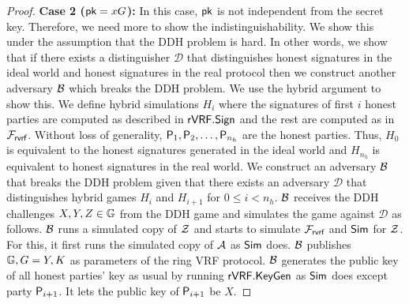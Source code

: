 \begin{proof}
	\textbf{Case 2 ($ \mathsf{pk} = x G$):} In this case, $ \mathsf{pk} $ is not independent from the secret key. Therefore, we need more to show the indistinguishability. We  show this under the assumption that the DDH problem  is hard.  In other words, we show that if there exists a distinguisher $ \mathcal{D} $ that distinguishes honest signatures in the ideal world and honest signatures in the real protocol then we construct another adversary $ \mathcal{B} $ which breaks the DDH problem. 
	We use the hybrid argument to show this.
	We define hybrid simulations $ H_{i} $ where  the signatures of first $ i $ honest parties are computed as described in $ {\mathsf{rVRF}}.{\mathsf{Sign}} $ and the rest are computed as in $ \mathcal{F}_{\textsf{rvrf}} $. Without loss of generality, $ \mathsf{P}_1, \mathsf{P}_2, \ldots, \mathsf{P}_{n_h} $ are the honest parties. Thus, $ H_0 $ is equivalent to the honest signatures generated in the ideal world  and $ H_{n_h}  $ is equivalent to  honest signatures in the real world.  We construct an adversary $ \mathcal{B} $ that breaks the DDH problem given that there exists an adversary $ \mathcal{D} $ that distinguishes hybrid games $ H_i $ and $ H_{i + 1} $ for $ 0 \leq i < n_h $. $\mathcal{B} $ receives the DDH challenges $ X,Y, Z \in {\mathbb{G}} $ from the DDH game and simulates the game against $ \mathcal{D} $ as follows. 
	$ \mathcal{B} $ runs a simulated copy of $ \mathcal{Z} $ and starts to simulate $ \mathcal{F}_{\textsf{rvrf}} $ and $ \mathsf{Sim} $ for $ \mathcal{Z} $. For this, it first runs the simulated copy of $ \mathcal{A} $ as $ \mathsf{Sim} $ does. $  \mathcal{B} $ publishes $ {\mathbb{G}}, G = Y, K $ as parameters of the ring VRF protocol. $\mathcal{B} $ generates the public key of all  honest parties' key as usual by running $ {\mathsf{rVRF}}.{\mathsf{KeyGen}}$ as $ \mathsf{Sim} $ does except party $ \mathsf{P}_{i+1} $. It lets the public key of $ \mathsf{P}_{i + 1} $ be $ X $.
	
	

\end{proof}
